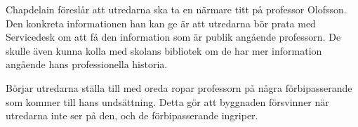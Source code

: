 Chapdelain föreslår att utredarna ska ta en närmare titt på professor Olofsson. Den konkreta informationen han kan ge är att utredarna bör prata med Servicedesk om att få den information som är publik angående professorn. De skulle även kunna kolla med skolans bibliotek om de har mer information angående hans professionella historia.

Börjar utredarna ställa till med oreda ropar professorn på några förbipasserande som kommer till hans undsättning. Detta gör att byggnaden försvinner när utredarna inte ser på den, och de förbipasserande ingriper.
